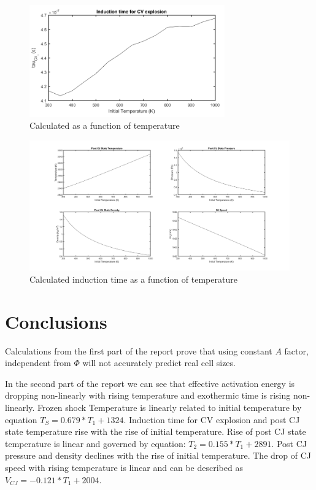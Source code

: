 \documentclass[a4paper]{article}
\begin{document}
\begin{figure}[H]
\centering
\includegraphics[width=0.75\textwidth]{2_ind_time_CV_expl.png}
\caption{\label{fig:part2_4}Calculated as a function of temperature}
\end{figure}

\begin{figure}[H]
\centering
\includegraphics[width=1\textwidth]{2_post_CJ.png}
\caption{\label{fig:part2_5}Calculated induction time as a function of temperature}
\end{figure}


\section{Conclusions}

Calculations from the first part of the report prove that using constant $A$ factor, independent from $\Phi$  will not accurately predict real cell sizes.

In the second part of the report we can see that effective activation energy is dropping non-linearly with rising temperature and exothermic time is rising non-linearly.
Frozen shock Temperature is linearly related to initial temperature by equation $T_S=0.679*T_1+1324$.
Induction time for CV explosion and post CJ state temperature rise with the rise of initial temperature. Rise of post CJ state temperature is linear and governed by equation: $T_2=0.155*T_1+2891$.
Post CJ pressure and density declines with the rise of initial temperature. The drop of CJ speed with rising temperature is linear and can be described as $V_{CJ}=-0.121*T_1+2004$.



\end{document}
